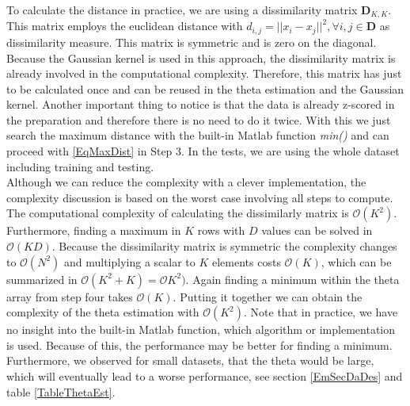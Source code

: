 \FloatBarrier
To calculate the distance in practice, we are using a dissimilarity matrix $\mathbf{D}_{K,K}$.
This matrix employs the euclidean distance with $d_{i,j}=||x_i-x_j||^2, \forall i,j \in \mathbf{D}$ as dissimilarity measure.
This matrix is symmetric and is zero on the diagonal.\cite[p. 22,299]{Gentle.2007}\newline
Because the Gaussian kernel is used in this approach, the dissimilarity matrix is already involved in the computational complexity.
Therefore, this matrix has just to be calculated once and can be reused in the theta estimation and the Gaussian kernel.
Another important thing to notice is that the data is already z-scored in the preparation and therefore there is no need to do it twice.
With this we just search the maximum distance with the built-in Matlab function \textit{min()} and can proceed with \eqref{EqMaxDist} in Step 3.
In the tests, we are using the whole dataset including training and testing.\\
Although we can reduce the complexity with a clever implementation, the complexity discussion is based on the worst case involving all steps to compute.
The computational complexity of calculating the dissimilarly matrix is $\mathcal{O}(K^2)$.\cite{Kobti.2007}
Furthermore, finding a maximum in $K$ rows with $D$ values can be solved in $\mathcal{O}(KD)$.
Because the dissimilarity matrix is symmetric the complexity changes to $\mathcal{O}(N^2)$ and multiplying a scalar to $K$ elements costs $\mathcal{O}(K)$, which can be summarized in $\mathcal{O}(K^2+K)=\mathcal{O}K^2)$.
Again finding a minimum within the theta array from step four takes $\mathcal{O}(K)$.
Putting it together we can obtain the complexity of the theta estimation with $\mathcal{O}(K^2)$.
Note that in practice, we have no insight into the built-in Matlab function, which algorithm or implementation is used.
Because of this, the performance may be better for finding a minimum.
Furthermore, we observed for small datasets, that the theta would be large, which will eventually lead to a worse performance, see section \ref{EmSecDaDes} and table \ref{TableThetaEst}.
